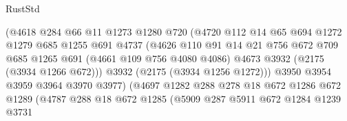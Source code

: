 \begin{lexlean}{RustStd}
\begin{coremodule}
                                (@4618
                                  @284
                                  @66
                                  @11
                                  @1273
                                  @1280
                                  @720
                                  (@4720
                                    @112
                                    @14
                                    @65
                                    @694
                                    @1272
                                    @1279
                                    @685
                                    @1255
                                    @691
                                    @4737
                                    (@4626
                                      @110
                                      @91
                                      @14
                                      @21
                                      @756
                                      @672
                                      @709
                                      @685
                                      @1265
                                      @691
                                      (@4661 @109 @756 @4080 @4086)
                                      @4673
                                      @3932
                                      (@2175 (@3934 @1266 @672)))
                                    @3932
                                    (@2175 (@3934 @1256 @1272)))
                                  @3950
                                  @3954
                                  @3959
                                  @3964
                                  @3970
                                  @3977)
                                (@4697
                                  @1282
                                  @288
                                  @278
                                  @18
                                  @672
                                  @1286
                                  @672
                                  @1289
                                  (@4787
                                    @288
                                    @18
                                    @672
                                    @1285
                                    (@5909
                                      @287
                                      @5911
                                      @672
                                      @1284
                                      @1239
                                      @3731

\end{coremodule}
\end{lexlean}
